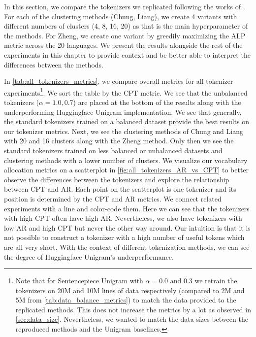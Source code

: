 

In this section, we compare the tokenizers we replicated following the works of \citet{chung_improving_2020,zheng_allocating_2021,liang_xlm-v_2023}. For each of the clustering methods (Chung, Liang), we create 4 variants with different numbers of clusters (4, 8, 16, 20) as that is the main hyperparameter of the methods. For Zheng, we create one variant by greedily maximizing the ALP metric across the 20 languages. We present the results alongside the rest of the experiments in this chapter to provide context and be better able to interpret the differences between the methods.

In \autoref{tab:all_tokenizers_metrics}, we compare overall metrics for all tokenizer experiments\footnote{Note that for Sentencepiece Unigram with $\alpha=0.0\text{ and }0.3$ we retrain the tokenizers on 20M and 10M lines of data respectively (compared to 2M and 5M from \autoref{tab:data_balance_metrics}) to match the data provided to the replicated methods. This does not increase the metrics by a lot as observed in \autoref{sec:data_size}. Nevertheless, we wanted to match the data sizes between the reproduced methods and the Unigram baselines.}. We sort the table by the CPT metric. We see that the unbalanced tokenizers ($\alpha=1.0, 0.7$) are placed at the bottom of the results along with the underperforming Huggingface Unigram implementation. We see that generally, the standard tokenizers trained on a balanced dataset provide the best results on our tokenizer metrics. Next, we see the clustering methods of Chung and Liang with 20 and 16 clusters along with the Zheng method. Only then we see the standard tokenizers trained on less balanced or unbalanced datasets and clustering methods with a lower number of clusters. We visualize our vocabulary allocation metrics on a scatterplot in \autoref{fig:all_tokenizers_AR_vs_CPT} to better observe the differences between the tokenizers and explore the relationship between CPT and AR. Each point on the scatterplot is one tokenizer and its position is determined by the CPT and AR metrics. We connect related experiments with a line and color-code them. Here we can see that the tokenizers with high CPT often have high AR. Nevertheless, we also have tokenizers with low AR and high CPT but never the other way around. Our intuition is that it is not possible to construct a tokenizer with a high number of useful tokens which are all very short. With the context of different tokenization methods, we can see the degree of Huggingface Unigram's underperformance.

